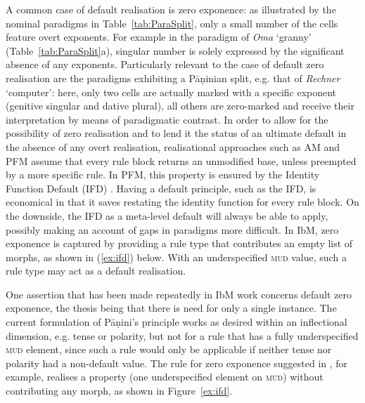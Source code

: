 \documentclass[output=paper
	        ,collection
	        ,collectionchapter
 	        ,biblatex
                ,babelshorthands
                ,newtxmath
                ,draftmode
                ,colorlinks, citecolor=brown
]{langscibook}
\begin{document}
\begin{exe}
\begin{xlist}
\begin{exe}
\begin{xlist}
\begin{exe}
\end{exe}

A common case of default realisation is zero exponence: as illustrated
by the  nominal paradigms in Table~\ref{tab:ParaSplit}, only a
small number of the cells feature overt exponents. For example in the paradigm
of \textit{Oma} `granny' (Table~\ref{tab:ParaSplit}a), singular number
is solely expressed by the significant absence of any
exponents. Particularly relevant to the case of default zero
realisation are the paradigms exhibiting a Pāṇinian split, e.g. that
of \textit{Rechner} `computer': here, only two cells are actually
marked with a specific exponent (genitive singular and dative plural),
all others are zero-marked and receive their interpretation by means
of paradigmatic contrast. In order to allow for the possibility of
zero realisation and to lend it the status of an ultimate default in
the absence of any overt realisation, realisational approaches such as
AM and PFM assume that every rule block returns an unmodified base,
unless preempted by a more specific rule. In PFM, this property is
ensured by the Identity Function Default (IFD)
\citep[][53]{Stump01}. Having a default principle, such as the IFD, is
economical in that it saves restating the identity function for every
rule block. On the downside, the IFD as a meta-level default 
will always be able to apply, possibly making an account of gaps in
paradigms more difficult. In IbM, zero exponence is captured by
providing a rule type that contributes an empty list of morphs, as
shown in (\ref{ex:ifd}) below. With an underspecified \textsc{mud}
value, such a rule type may act as a default realisation.

One assertion that has been made repeatedly in IbM work concerns
default zero exponence, the thesis being that there is need for only a
single instance. The current formulation of Pāṇini's principle works
as desired within an inflectional dimension, e.g. tense or polarity,
but not for a rule that has a fully underspecified \textsc{mud}
element, since such a rule would only be applicable if neither tense
nor polarity had a non-default value.  The rule for zero exponence
suggested in \citet{Crysmann:Bonami:2016}, for example, realises a
property (one underspecified element on \textsc{mud}) without
contributing any morph, as shown in Figure~\ref{ex:ifd}.



\begin{figure} 


\end{figure}
\end{xlist}
\end{exe}
\end{xlist}
\end{exe}
\end{document}
